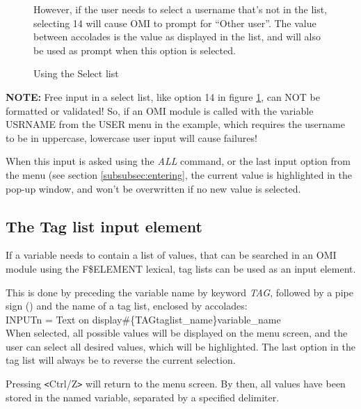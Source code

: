 \documentclass[a4paper]{book}
\newcommand{\vs}{\vspace{3mm}}
\newcommand{\lt}{\texttt{<}}
\newcommand{\gt}{\texttt{>}}
\renewcommand{\indent}{\hspace*{5mm}}
\begin{document}
\begin{figure}[ht]
\begin{minipage}[t]{\textwidth}
\noindent However, if the user needs to select a username that's not in the list, 
selecting 14 will cause OMI to prompt for ``Other user''. The value 
between accolades is the value as displayed in the list, and will also be 
used as prompt when this option is selected.

\caption{Using the Select list}\label{fig:freeselect}
\hrulefill
\end{minipage}
\end{figure}

\vs

\hspace{-8mm}\textbf{NOTE:} Free input in a select list, like option 14 in figure \ref{fig:freeselect}, 
can NOT be formatted or validated! So, if an OMI module is called with the 
variable USRNAME from the USER menu in the example, which requires the 
username to be in uppercase, lowercase user input will cause failures!

When this input is asked using the \textsl{ALL} command, or 
the last input option from the menu (see section \ref{subsubsec:entering}, the current value is highlighted in the 
pop-up window, and won't be overwritten if no new value is selected.

\subsection{The Tag list input element}
\label{subsubsec:mylabel40}

If a variable needs to contain a list of values, that can be searched in an 
OMI module using the F{\$}ELEMENT lexical, tag lists can be used as an 
input element.

\vs

This is done by preceding the variable name by keyword \textsl{TAG}, followed by a 
pipe sign (\textbar) and the name of a tag list, enclosed by accolades: \\
\indent\textsf{INPUTn = Text on display{\#}{\{}TAG\textbar taglist{\_}name{\}}variable{\_}name} \\
When selected, all possible values will be displayed on the menu screen, and 
the user can select all desired values, which will be highlighted. The last 
option in the tag list will always be to reverse the current selection.

Pressing \lt Ctrl/Z\gt{} will return to the menu screen. By then, all values have 
been stored in the named variable, separated by a specified delimiter.
\end{document}
